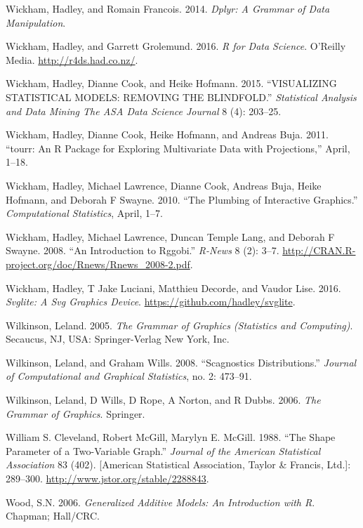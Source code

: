 \documentclass[12pt,]{isuthesis}
\begin{document}
\hypertarget{ref-dplyr}{}
Wickham, Hadley, and Romain Francois. 2014. \emph{Dplyr: A Grammar of
Data Manipulation}.

\hypertarget{ref-r4ds}{}
Wickham, Hadley, and Garrett Grolemund. 2016. \emph{R for Data Science}.
O'Reilly Media. \url{http://r4ds.had.co.nz/}.

\hypertarget{ref-Wickham:2015ur}{}
Wickham, Hadley, Dianne Cook, and Heike Hofmann. 2015. ``VISUALIZING
STATISTICAL MODELS: REMOVING THE BLINDFOLD.'' \emph{Statistical Analysis
and Data Mining The ASA Data Science Journal} 8 (4): 203--25.

\hypertarget{ref-tourr}{}
Wickham, Hadley, Dianne Cook, Heike Hofmann, and Andreas Buja. 2011.
``tourr: An R Package for Exploring Multivariate Data with
Projections,'' April, 1--18.

\hypertarget{ref-plumbing}{}
Wickham, Hadley, Michael Lawrence, Dianne Cook, Andreas Buja, Heike
Hofmann, and Deborah F Swayne. 2010. ``The Plumbing of Interactive
Graphics.'' \emph{Computational Statistics}, April, 1--7.

\hypertarget{ref-rggobi}{}
Wickham, Hadley, Michael Lawrence, Duncan Temple Lang, and Deborah F
Swayne. 2008. ``An Introduction to Rggobi.'' \emph{R-News} 8 (2): 3--7.
\url{http://CRAN.R-project.org/doc/Rnews/Rnews_2008-2.pdf}.

\hypertarget{ref-svglite}{}
Wickham, Hadley, T Jake Luciani, Matthieu Decorde, and Vaudor Lise.
2016. \emph{Svglite: A Svg Graphics Device}.
\url{https://github.com/hadley/svglite}.

\hypertarget{ref-Wilkinson:2005}{}
Wilkinson, Leland. 2005. \emph{The Grammar of Graphics (Statistics and
Computing)}. Secaucus, NJ, USA: Springer-Verlag New York, Inc.

\hypertarget{ref-Wilkinson:2008}{}
Wilkinson, Leland, and Graham Wills. 2008. ``Scagnostics
Distributions.'' \emph{Journal of Computational and Graphical
Statistics}, no. 2: 473--91.

\hypertarget{ref-wilkinson}{}
Wilkinson, Leland, D Wills, D Rope, A Norton, and R Dubbs. 2006.
\emph{The Grammar of Graphics}. Springer.

\hypertarget{ref-banking}{}
William S. Cleveland, Robert McGill, Marylyn E. McGill. 1988. ``The
Shape Parameter of a Two-Variable Graph.'' \emph{Journal of the American
Statistical Association} 83 (402). {[}American Statistical Association,
Taylor \& Francis, Ltd.{]}: 289--300.
\url{http://www.jstor.org/stable/2288843}.

\hypertarget{ref-mgcv}{}
Wood, S.N. 2006. \emph{Generalized Additive Models: An Introduction with
R}. Chapman; Hall/CRC.
\end{document}
